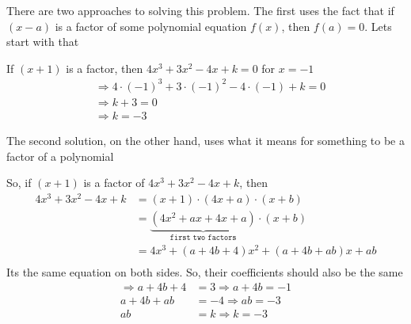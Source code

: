 \begin{solution}
	There are two approaches to solving this problem. The first uses the fact
	that if $(x-a)$ is a factor of some polynomial equation $f(x)$, then $f(a) = 0$.
	Lets start with that
	
	If $(x+1)$ is a factor, then $4x^3+3x^2-4x+k = 0 $ for $x = -1$
	\begin{align}
		& \Rightarrow 4\cdot(-1)^3+3\cdot(-1)^2-4\cdot(-1)+k = 0 \\
		& \Rightarrow k + 3 = 0 \\
		& \Rightarrow k = -3
	\end{align}
	
	The second solution, on the other hand, uses what it means for something
	to be a factor of a polynomial
	
	So, if $(x+1)$ is a factor of $4x^3+3x^2-4x+k$, then 
	\begin{align}
		4x^3+3x^2-4x+k &= (x+1)\cdot(4x+a)\cdot(x+b) \\
					   &= \underbrace{(4x^2+ax+4x+a)}_\texttt{first two factors}\cdot(x+b) \\
					   &= 4x^3+(a+4b+4)x^2+(a+4b+ab)x+ab \\
	\end{align}	 
	Its the same equation on both sides. So, their coefficients should also be the same
	\begin{align}
		\Rightarrow a+4b+4 &= 3 \Rightarrow a + 4b = -1\\
		            a+4b+ab &= -4 \Rightarrow ab = -3\\
		            ab &= k \Rightarrow k = -3
	\end{align}
	
\end{solution}
